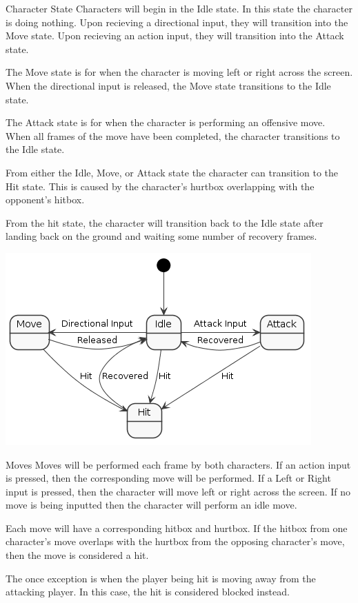 \documentclass[12pt]{report}
\begin{document}
\begin{section}{Character State}
Characters will begin in the Idle state. In this state the character is doing
nothing. Upon recieving a directional input, they will transition into the Move 
state. Upon recieving an action input, they will transition into the Attack
state.

The Move state is for when the character is moving left or right across the
screen. When the directional input is released, the Move state transitions to
the Idle state.

The Attack state is for when the character is performing an offensive move.
When all frames of the move have been completed, the character transitions to
the Idle state.

From either the Idle, Move, or Attack state the character can transition to the
Hit state. This is caused by the character's hurtbox overlapping with the
opponent's hitbox.

From the hit state, the character will transition back to the Idle state after
landing back on the ground and waiting some number of recovery frames.

\includegraphics[width=\textwidth]{state.png}

\end{section}

\begin{section}{Moves}
Moves will be performed each frame by both characters. If an action input is
pressed, then the corresponding move will be performed. If a Left or Right input
is pressed, then the character will move left or right across the screen. If no
move is being inputted then the character will perform an idle move.

Each move will have a corresponding hitbox and hurtbox. If the hitbox from
one character's move overlaps with the hurtbox from the opposing character's
move, then the move is considered a hit.

The once exception is when the player being hit is moving away from the
attacking player. In this case, the hit is considered blocked instead.
\end{section}
\end{document}
